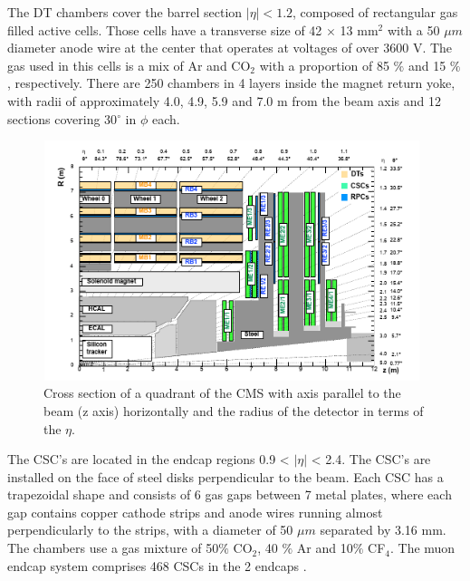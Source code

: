  
The DT chambers cover the barrel section $|\eta|<1.2$, composed of rectangular gas filled active cells. Those cells have a transverse size of 42 $\times$ 13 mm$^2$ with a 50 $\mu m$ diameter anode wire at the center that operates at voltages of over 3600 V. The gas used in this cells is a mix of Ar and CO$_2$ with a proportion of 85 $\%$ and 15 $\%$, respectively. There are 250 chambers in 4 layers inside the magnet return yoke, with radii of approximately 4.0, 4.9, 5.9 and 7.0 m from the beam axis and 12 sections covering 30$^\circ$ in $\phi$ each.

\begin{figure}[ht]
	\centering
	\includegraphics[width=11cm,height=7cm]{Chapter2/csc}
	\caption[Cross section of a quadrant of the CMS with axis parallel to the beam (z axis) horizontally and the radius of the detector in terms of the $\eta$]{Cross section of a quadrant of the CMS with axis parallel to the beam (z axis) horizontally and the radius of the detector in terms of the $\eta$\cite{cms-manual}.}
	\label{dt}
\end{figure}

The CSC's are located in the endcap regions 0.9 < $|\eta|$ < 2.4. The CSC's are installed on the face of steel disks perpendicular to the beam. 
Each CSC has a trapezoidal shape and consists of 6 gas gaps between 7 metal plates, where each gap contains copper cathode strips and anode wires running almost perpendicularly to
the strips, with a diameter of 50 $\mu m$ separated by 3.16 mm. 
The chambers use a gas mixture of 50$\%$ CO$_2$, 40 $\%$ Ar and 10$\%$ CF$_4$. The muon endcap system comprises 468 CSCs in the 2 endcaps \cite{cms-manual,cms7}.


